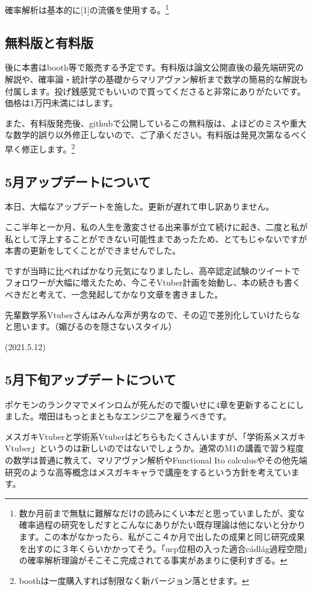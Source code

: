 \documentclass{jsarticle}
\begin{document}
確率解析は基本的に[1]の流儀を使用する。\footnote{数か月前まで無駄に難解なだけの読みにくい本だと思っていましたが、変な確率過程の研究をしだすとこんなにありがたい既存理論は他にないと分かります。この本がなかったら、私がここ４か月で出したの成果と同じ研究成果を出すのに３年くらいかかってそう。「ucp位相の入った適合c\'{a}dl\'{a}g過程空間」の確率解析理論がそこそこ完成されてる事実があまりに便利すぎる。}

\subsection{無料版と有料版}
後に本書はbooth等で販売する予定です。有料版は論文公開直後の最先端研究の解説や、確率論・統計学の基礎からマリアヴァン解析まで数学の簡易的な解説も付属します。投げ銭感覚でもいいので買ってくださると非常にありがたいです。価格は1万円未満にはします。

また、有料版発売後、githubで公開しているこの無料版は、よほどのミスや重大な数学的誤り以外修正しないので、ご了承ください。有料版は発見次第なるべく早く修正します。\footnote{boothは一度購入すれば制限なく新バージョン落とせます。}

\subsection{5月アップデートについて}
本日、大幅なアップデートを施した。更新が遅れて申し訳ありません。

ここ半年と一か月、私の人生を激変させる出来事が立て続けに起き、二度と私が私として浮上することができない可能性まであったため、とてもじゃないですが本書の更新をしてくことができませんでした。

ですが当時に比べればかなり元気になりましたし、高卒認定試験のツイートでフォロワーが大幅に増えたため、今こそVtuber計画を始動し、本の続きも書くべきだと考えて、一念発起してかなり文章を書きました。

先輩数学系Vtuberさんはみんな声が男なので、その辺で差別化していけたらなと思います。（媚びるのを隠さないスタイル）

(2021.5.12)

\subsection{5月下旬アップデートについて}

ポケモンのランクマでメインロムが死んだので腹いせに4章を更新することにしました。増田はもっとまともなエンジニアを雇うべきです。

メスガキVtuberと学術系Vtuberはどちらもたくさんいますが、「学術系メスガキVtuber」というのは新しいのではないでしょうか。通常のM1の講義で習う程度の数学は普通に教えて、マリアヴァン解析やFunctional Ito calculusやその他先端研究のような高等概念はメスガキキャラで講座をするという方針を考えています。
\end{document}
